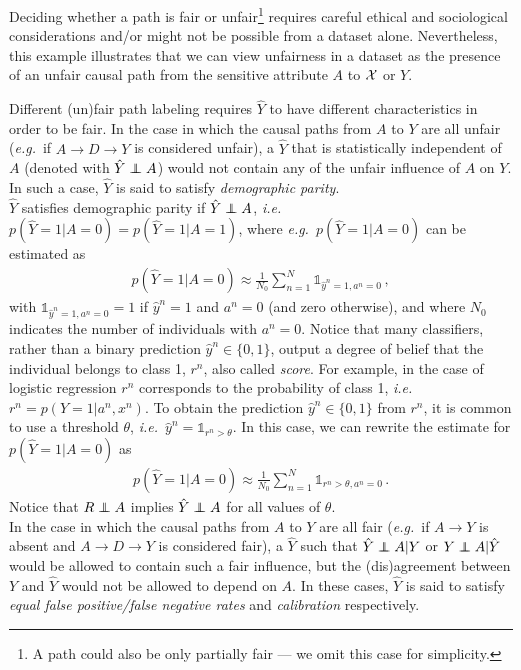\documentclass[runningheads]{llncs}
\newcommand\independent{\protect\mathpalette{\protect\independenT}{\perp}}
\def\independenT#1#2{\mathrel{\rlap{$#1#2$}\mkern2mu{#1#2}}}
\newcommand{\ie}{\emph{i.e.}}
\newcommand{\eg}{\emph{e.g.}}
\begin{document}
Deciding whether a path is fair or unfair\footnote{A path could also be only partially fair --- we omit this case for simplicity.} requires careful ethical and sociological considerations and/or might not be possible from a dataset alone. Nevertheless, this example illustrates that we can view unfairness in a dataset as the presence of an unfair causal path from the sensitive attribute $A$ to ${\cal X}$ or $Y$. 

Different (un)fair path labeling requires $\hat Y$ to have different characteristics in order to be fair. 
In the case in which the causal paths from $A$ to $Y$ are all unfair (\eg~if $A\rightarrow D \rightarrow Y$ is considered unfair), a $\hat Y$ that is statistically independent of $A$ (denoted with $\hat Y \independent A $) would not contain any of the unfair influence of $A$ on $Y$. In such a case, $\hat Y$ is said to satisfy \emph{demographic parity}.\\

$\hat Y$ satisfies demographic parity if $\hat Y \independent A $, \ie~$p(\hat Y=1|A=0)=p(\hat Y=1|A=1)$, where \eg~$p(\hat Y=1|A=0)$ can be estimated as 
\begin{align*}
p(\hat Y=1|A=0)
\approx \frac{1}{N_0} \sum_{n=1}^{N} \mathbb{1}_{\hat y^n = 1, a^n=0}\,,
\end{align*}
with $\mathbb{1}_{\hat y^n = 1, a^n=0}=1$ if $\hat y^n = 1$ and $a^n=0$ (and zero otherwise), and where $N_0$ indicates the number of individuals with $a^n=0$. Notice that many classifiers, rather than a  binary prediction $\hat y^n\in\{0,1\}$, output a degree of belief that the individual belongs to class 1, $r^n$, also called \emph{score}. For example, in the case of logistic regression $r^n$ corresponds to the probability of class 1, \ie~$r^n=p(Y = 1 | a^n, x^{n})$. To obtain the prediction $\hat y^n\in\{0,1\}$ from $r^n$, it is common to use a threshold $\theta$, \ie~$\hat y^n=\mathbb{1}_{r^n>\theta}$. In this case, we can rewrite the estimate for $p(\hat Y=1|A=0)$ as 
\begin{align*}
p(\hat Y=1|A=0) \approx \frac{1}{N_0}\sum_{n=1}^{N}\mathbb{1}_{r^n>\theta,a^n=0}\,.
\end{align*}
Notice that $R \independent A$ implies $\hat Y \independent A$ for all values of $\theta$.\\

In the case in which the causal paths from $A$ to $Y$ are all fair (\eg~if $A\rightarrow Y$ is absent and $A\rightarrow D\rightarrow Y$ is considered fair), a $\hat Y$ such that $\hat Y \independent A | Y$ or $Y \independent A | \hat Y$ would be allowed to contain such a fair influence, but the (dis)agreement between $Y$ and $\hat Y$ would not be allowed to depend on $A$. In these cases, $\hat Y$ is said to satisfy \emph{equal false positive/false negative rates} and \emph{calibration} respectively.\\
\end{document}

